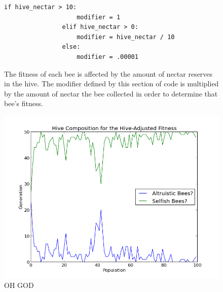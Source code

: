 \documentclass[11pt]{article}
\begin{document}
			\begin{figure}[tb]
				\begin{Verbatim}[frame=single]
                if hive_nectar > 10:
                    modifier = 1
                elif hive_nectar > 0:
                    modifier = hive_nectar / 10
                else:
                    modifier = .00001 
				\end{Verbatim}
				\caption{The fitness of each bee is affected by the amount of nectar reserves in the hive. The modifier defined by this section of code is multiplied by the amount of nectar the bee collected in order to determine that bee's fitness.}
				\label{fig:modifier_algorithm}
			\end{figure}

			\begin{figure}[tb]
				\begin{center}
					\includegraphics[scale=.5]{results/hive_fitness_comp.png}
				\end{center}
				\caption{OH GOD}
				\label{fig:hive_fitness_composition}
			\end{figure}
\end{document}
